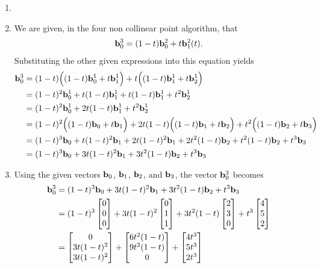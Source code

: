 \documentclass{article}
\begin{document}
\begin{enumerate}
\item %
\BEN
\item We are given, in the four non collinear point algorithm, that
\begin{align*}
  \mathbf{b}_0^3 = (1- t)\mathbf{b}_0^2 + t\mathbf{b}_1^2(t).
\end{align*}
Substituting the other given expressions into this equation yields
\begin{align*}
  \mathbf{b}_0^3 &= (1- t)\Big( (1-t)\mathbf{b}_0^1 + t\mathbf{b}_1^1 \Big) + t\Big( (1-t)\mathbf{b}_1^1 + t\mathbf{b}_2^1 \Big) \\
  &= (1-t)^2\mathbf{b}_0^1 + t(1-t)\mathbf{b}_1^1 + t (1-t)\mathbf{b}_1^1 + t^2\mathbf{b}_2^1 \\
  &= (1-t)^2\mathbf{b}_0^1 +2 t(1-t)\mathbf{b}_1^1 + t^2\mathbf{b}_2^1 \\  
  &= (1-t)^2\Big( (1-t)\mathbf{b}_0 +t\mathbf{b}_1\Big) +2 t(1-t)\Big( (1-t)\mathbf{b}_1 +t\mathbf{b}_2\Big) + t^2\Big( (1-t)\mathbf{b}_2 +t\mathbf{b}_3\Big) \\    
  &= (1-t)^3 \mathbf{b}_0 +t(1-t)^2\mathbf{b}_1+2 t(1-t)^2 \mathbf{b}_1 +2t^2(1-t)\mathbf{b}_2 + t^2(1-t)\mathbf{b}_2 +t^3\mathbf{b}_3\\
  &= (1-t)^3 \mathbf{b}_0 + 3 t(1-t)^2 \mathbf{b}_1 +3 t^2(1-t)\mathbf{b}_2 +t^3\mathbf{b}_3
\end{align*}
\item Using the given vectors $\mathbf{b}_0$, $\mathbf{b}_1$, $\mathbf{b}_2$, and $\mathbf{b}_3$, the vector $\mathbf{b}_0^3$ becomes
\begin{align*}
  \MB{b}_0^3 &= (1-t)^3 \MB{b}_0 + 3 t(1-t)^2 \MB{b}_1 +3 t^2(1-t)\MB{b}_2 +t^3\MB{b}_3\\   
  &= (1-t)^3 \BM 0\\0\\0\EM + 3 t(1-t)^2 \BM 0\\1\\1\EM +3 t^2(1-t)\BM 2\\3\\0\EM +t^3 \BM 4\\5\\2\EM \\   
  &=  \BM 0\\3 t(1-t)^2\\3 t(1-t)^2\EM + \BM 6 t^2(1-t)\\ 9 t^2(1-t)\\0\EM + \BM 4t^3\\5 t^3\\2 t^3\EM \\   

\end{align*}
\end{enumerate}
\end{document}
